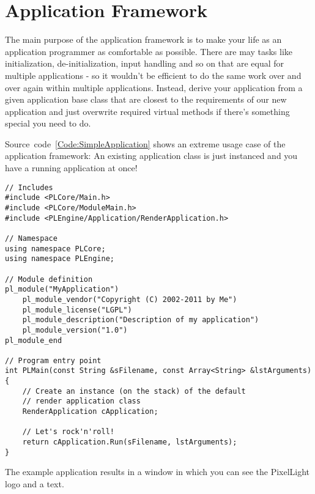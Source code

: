 \section{Application Framework}
The main purpose of the application framework is to make your life as an application programmer as comfortable as possible. There are may tasks like initialization, de-initialization, input handling and so on that are equal for multiple applications - so it wouldn't be efficient to do the same work over and over again within multiple applications. Instead, derive your application from a given application base class that are closest to the requirements of our new application and just overwrite required virtual methods if there's something special you need to do.

Source~code~\ref{Code:SimpleApplication} shows an extreme usage case of the application framework: An existing application class is just instanced and you have a running application at once!
\begin{lstlisting}[label=Code:SimpleApplication,caption={Simple application using the application framework}]
// Includes
#include <PLCore/Main.h>
#include <PLCore/ModuleMain.h>
#include <PLEngine/Application/RenderApplication.h>

// Namespace
using namespace PLCore;
using namespace PLEngine;

// Module definition
pl_module("MyApplication")
	pl_module_vendor("Copyright (C) 2002-2011 by Me")
	pl_module_license("LGPL")
	pl_module_description("Description of my application")
	pl_module_version("1.0")
pl_module_end

// Program entry point
int PLMain(const String &sFilename, const Array<String> &lstArguments)
{
	// Create an instance (on the stack) of the default
	// render application class
	RenderApplication cApplication;

	// Let's rock'n'roll!
	return cApplication.Run(sFilename, lstArguments);
}
\end{lstlisting}
The example application results in a window in which you can see the PixelLight logo and a text.

